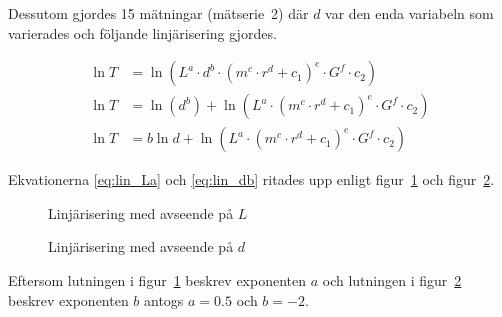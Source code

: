 \documentclass[a4paper,12pt]{article}
\begin{document}
Dessutom gjordes 15 mätningar (mätserie~2) där $d$ var den enda variabeln som varierades och
följande linjärisering gjordes.

\begin{align}
  \ln T &= \ln (L^a \cdot d^b \cdot (m^c \cdot r^d + c_1)^e \cdot G^f \cdot c_2) \nonumber \\
  \ln T &= \ln (d^b) + \ln (L^a \cdot (m^c \cdot r^d + c_1)^e \cdot G^f \cdot c_2) \nonumber \\
  \ln T &= b\ln d + \ln (L^a \cdot (m^c \cdot r^d + c_1)^e \cdot G^f \cdot c_2)  \label{eq:lin_db}
\end{align}

Ekvationerna \eqref{eq:lin_La} och \eqref{eq:lin_db} ritades upp enligt
figur~\ref{fig:lin_La} och figur~\ref{fig:lin_db}.

\begin{figure}
  \caption{Linjärisering med avseende på $L$}
  \label{fig:lin_La}
\end{figure}

\begin{figure}
  \caption{Linjärisering med avseende på $d$}
  \label{fig:lin_db}
\end{figure}

Eftersom lutningen i figur~\ref{fig:lin_La} beskrev exponenten $a$ och lutningen
i figur~\ref{fig:lin_db} beskrev exponenten $b$ antogs $a = 0.5$ och $b = -2$.
\end{document}
